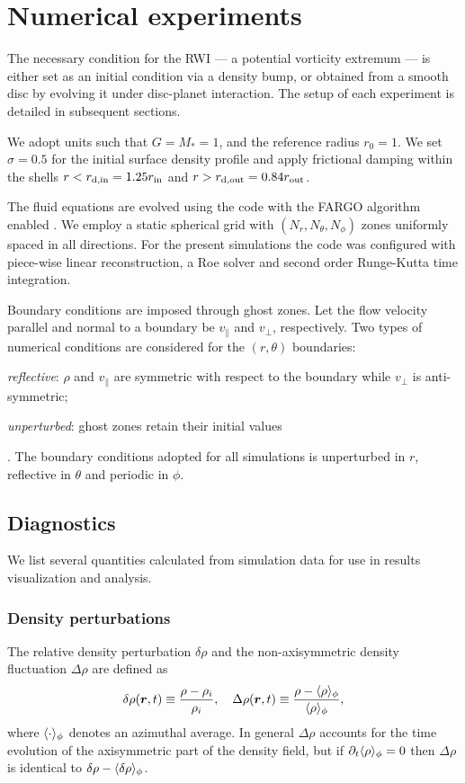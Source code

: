 \section{Numerical experiments}\label{sims}
The necessary condition for the RWI --- a potential vorticity 
extremum \citep{li00} --- is either set as an initial condition
via a density bump, or obtained from a smooth disc by evolving it
under disc-planet interaction. The setup of each experiment is
detailed in subsequent sections.    

We adopt units such that $G=M_*=1$, and the reference radius $r_0=1$.    
We set $\sigma=0.5$ for the initial surface density profile and apply 
frictional damping within the shells $r<r_\mathrm{d,in} = 1.25r_\mathrm{in}$
and $r>r_\mathrm{d,out}=0.84r_\mathrm{out}$.

The fluid equations are evolved using the \pluto code \citep{mignone07} with 
the FARGO algorithm enabled  \citep{masset00,mignone12}. We employ a static
spherical grid with $(N_r, N_\theta, N_\phi)$ zones uniformly spaced
in all directions. For the present simulations the code was configured
with piece-wise linear reconstruction, a Roe solver and second order
Runge-Kutta time integration.   

Boundary conditions are imposed through ghost zones.   
Let the flow velocity parallel and normal to a boundary be
$v_\parallel$ and $v_\perp$, respectively. Two types of numerical 
conditions are considered for the $(r,\theta)$ boundaries:
\begin{inparaenum}[(a)]
\item \emph{reflective}: $\rho$ and $v_\parallel$ are symmetric with
  respect to the boundary while $v_\perp$ is anti-symmetric;  
\item \emph{unperturbed}: ghost zones retain their initial values
\end{inparaenum}. 
The boundary conditions adopted for all simulations is unperturbed in
$r$, reflective in $\theta$ and periodic in $\phi$. 


\subsection{Diagnostics}
We list several quantities calculated from simulation data for use in
results visualization and analysis.  
 
\subsubsection{Density perturbations}
The relative density perturbation $\delta\rho$ 
and the non-axisymmetric density fluctuation $\Delta\rho$ are defined as 
\begin{align}
  \delta\rho(\bm{r},t) \equiv \frac{\rho - \rho_i}{\rho_i}, \quad
  \Delta\rho(\bm{r},t) \equiv \frac{\rho -
    \langle \rho \rangle_\phi}{\langle \rho \rangle_\phi}, 
\end{align} 
where $\langle \cdot \rangle_\phi$ denotes an azimuthal average.  
In general $\Delta\rho$ accounts for the time evolution of 
the axisymmetric part of the density field, but if
$\partial_t\langle \rho \rangle_\phi=0$ then $\Delta\rho$ is identical to
$\delta\rho-\langle \delta\rho \rangle_\phi$.    

